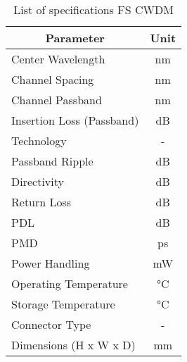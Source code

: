 \begin{table}[!ht]
	\centering
	\cite{noauthor_4ch_nodate}
	\begin{tabular} {|l|c|}
		\hline
		\multicolumn{1}{|c|}{\textbf{Parameter}} & \textbf{Unit} \\ \hline\hline
		Center Wavelength & \unit{\nm} \\ \hline
		Channel Spacing & \unit{\nm} \\ \hline
		Channel Passband & \unit{\nm} \\ \hline
		Insertion Loss (Passband) & \unit{\dB} \\ \hline
		Technology & - \\ \hline
		Passband Ripple & \unit{\dB} \\ \hline
		Directivity & \unit{\dB} \\ \hline
		Return Loss & \unit{\dB} \\ \hline
		PDL & \unit{\dB} \\ \hline
		PMD & \unit{\ps} \\ \hline
		Power Handling & \unit{\mW} \\ \hline
		Operating Temperature & \unit{\degreeCelsius} \\ \hline
		Storage Temperature & \unit{\degreeCelsius} \\ \hline
		Connector Type & - \\ \hline
		Dimensions (H x W x D) & \unit{\mm} \\ \hline
	\end{tabular}
	\caption{List of specifications FS CWDM}
	\label{table:specs2}
\end{table}



